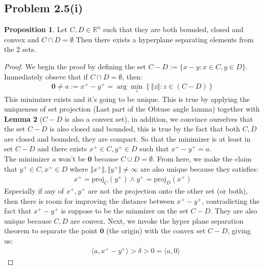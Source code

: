 \documentclass[]{article}
\theoremstyle{definition}
\newtheorem{prop}{Proposition}
\begin{document}
    \subsection{Problem 2.5(i)}
        \begin{prop}
            Let $C, D\in \mathbb R^n$ such that they are both bounded, closed and convex and $C\cap D = \emptyset$ Then there exists a hyperplane separating elements from the 2 sets.
        \end{prop}
        \begin{proof}
            We begin the proof by defining the set $C - D := \{x - y: x\in C, y \in D\}$. Immediately obseve that if $C \cap D = \emptyset$, then: 
            \begin{align}
                \mathbf 0 \neq a:= x^+ - y^+ = \arg\min_{z}
                \left\lbrace
                    \Vert z\Vert: z\in (C - D)
                \right\rbrace
            \end{align}
            This minimizer exists and it's going to be unique. This is true by applying the uniqueness of set projection (Last part of the Obtuse angle lamma) together with \textbf{Lemma 2} ($C-D$ is also a convex set), in addition, we convince ourselves that the set $C - D$ is also closed and bounded, this is true by the fact that both $C, D$ are closed and bounded, they are compact. So that the minimizer is at least in set $C - D$ and there exists $x^+ \in C, y^+ \in D$ such that $x^+ - y^+ = a$. 
            \\
            The minimizer $a$ won't be $\mathbf 0$ because $C\cup D = \emptyset$. From here, we make the claim that $y^{+}\in C, x^{+}\in D$ where $\Vert x^+\Vert, \Vert y^+\Vert\neq \infty$ are also unique because they satisfies: 
            \begin{align}
                x^+ = \text{proj}_{C}(y^+) \wedge y^+ = \text{proj}_D(x^+)
            \end{align}
            Especially if any of $x^+, y^+$ are not the projection onto the other set (or both), then there is room for improving the distance between $x^+ - y^+$, contradicting the fact that $x^+ - y^+$ is suppose to be the minmizer on the set $C - D$. They are also unique because $C, D$ are convex. 
            Next, we invoke the hyper plane separation theorem to separate the point $\mathbf 0$ (the origin) with the convex set $C - D$, giving us: 
            \begin{align}
                & \langle a, x^+ - y^+ \rangle >  \delta > 0 = \langle a, 0\rangle

\end{align}
\end{proof}
\end{document}
